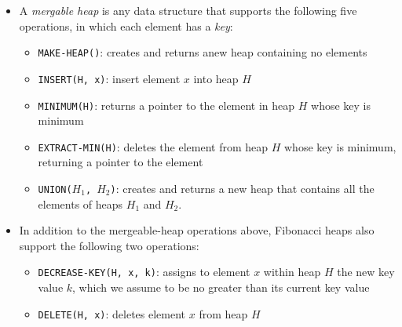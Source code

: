 \documentclass{report}
\begin{document}
\begin{itemize}
    \item A \textit{mergable heap} is any data structure that supports the following five operations, in which each element has a \textit{key}:
    \begin{itemize}
        \item \texttt{MAKE-HEAP()}: creates and returns anew heap containing no elements
        \item \texttt{INSERT(H, x)}: insert element $x$ into heap $H$ 
        \item \texttt{MINIMUM(H)}: returns a pointer to the element in heap $H$ whose key is minimum
        \item \texttt{EXTRACT-MIN(H)}: deletes the element from heap $H$ whose key is minimum, returning a pointer to the element
        \item \texttt{UNION($H_1$, $H_2$)}: creates and returns a new heap that contains all the elements of heaps $H_1$ and $H_2$.
    \end{itemize}
    \item In addition to the mergeable-heap operations above, Fibonacci heaps also support the following two operations:
    \begin{itemize}
        \item \texttt{DECREASE-KEY(H, x, k)}: assigns to element $x$ within heap $H$ the new key value $k$, which we assume to be no greater than its current key value
        \item \texttt{DELETE(H, x)}: deletes element $x$ from heap $H$
    \end{itemize}
\end{itemize}
\end{document}
